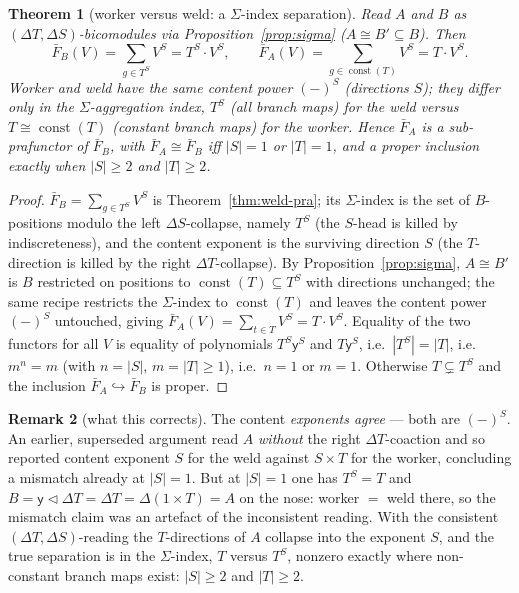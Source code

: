 \documentclass[11pt]{amsart}
\theoremstyle{plain}
\newtheorem{theorem}{Theorem}[section]
\theoremstyle{definition}
\newtheorem{remark}[theorem]{Remark}
\renewcommand{\lhd}{\triangleleft}
\newcommand{\Store}[1]{\Delta #1}
\newcommand{\yon}{\mathsf{y}}
\DeclareMathOperator{\const}{const}
\begin{document}
\begin{theorem}[worker versus weld: a $\Sigma$-index separation]\label{thm:separation}
Read $A$ and $B$ as $(\Store{T},\Store{S})$-bicomodules via Proposition~\ref{prop:sigma}
($A\cong B'\subseteq B$). Then
\[
\bar F_B(V)=\sum_{g\in T^{S}}V^{S}=T^{S}\cdot V^{S},
\qquad
\bar F_A(V)=\sum_{g\in\const(T)}V^{S}=T\cdot V^{S}.
\]
Worker and weld have the \emph{same} content power $(-)^{S}$ (directions $S$); they differ
\emph{only} in the $\Sigma$-aggregation index, $T^{S}$ (all branch maps) for the weld versus
$T\cong\const(T)$ (constant branch maps) for the worker. Hence $\bar F_A$ is a
sub-prafunctor of $\bar F_B$, with $\bar F_A\cong\bar F_B$ \emph{iff} $|S|=1$ or $|T|=1$, and
a \emph{proper} inclusion exactly when $|S|\ge 2$ and $|T|\ge 2$.
\end{theorem}

\begin{proof}
$\bar F_B=\sum_{g\in T^{S}}V^{S}$ is Theorem~\ref{thm:weld-pra}; its $\Sigma$-index is the set
of $B$-positions modulo the left $\Store{S}$-collapse, namely $T^{S}$ (the $S$-head is killed
by indiscreteness), and the content exponent is the surviving direction $S$ (the
$T$-direction is killed by the right $\Store{T}$-collapse). By Proposition~\ref{prop:sigma},
$A\cong B'$ is $B$ restricted on positions to $\const(T)\subseteq T^{S}$ with directions
unchanged; the same recipe restricts the $\Sigma$-index to $\const(T)$ and leaves the content
power $(-)^{S}$ untouched, giving $\bar F_A(V)=\sum_{t\in T}V^{S}=T\cdot V^{S}$. Equality of
the two functors for all $V$ is equality of polynomials $T^{S}\yon^{S}$ and $T\yon^{S}$, i.e.\
$|T^{S}|=|T|$, i.e.\ $m^{n}=m$ (with $n=|S|$, $m=|T|\ge 1$), i.e.\ $n=1$ or $m=1$. Otherwise
$T\subsetneq T^{S}$ and the inclusion $\bar F_A\hookrightarrow\bar F_B$ is proper.
\end{proof}

\begin{remark}[what this corrects]\label{rem:correct}
The content \emph{exponents agree} --- both are $(-)^{S}$. An earlier, superseded argument
read $A$ \emph{without} the right $\Store{T}$-coaction and so reported content exponent $S$
for the weld against $S\times T$ for the worker, concluding a mismatch already at $|S|=1$. But
at $|S|=1$ one has $T^{S}=T$ and $B=\yon\lhd\Store{T}=\Store{T}=\Store{(1\times T)}=A$ on the
nose: worker $=$ weld there, so the mismatch claim was an artefact of the inconsistent reading.
With the consistent $(\Store{T},\Store{S})$-reading the $T$-directions of $A$ collapse into the
exponent $S$, and the true separation is in the $\Sigma$-index, $T$ versus $T^{S}$, nonzero
exactly where non-constant branch maps exist: $|S|\ge 2$ and $|T|\ge 2$.
\end{remark}
\end{document}
